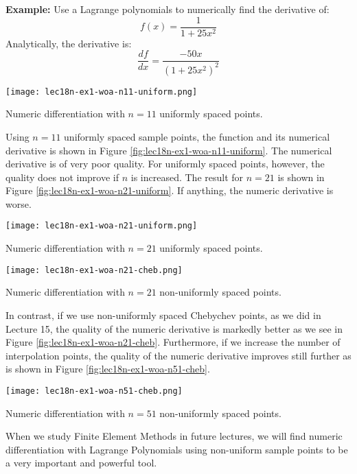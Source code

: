 \noindent\textbf{Example:} Use a Lagrange polynomials to numerically find the derivative of:
\begin{equation}
f(x) = \frac{1}{1+25x^2}
\label{eq:lec18n-f-ex1}
\end{equation}
Analytically, the derivative is:
\begin{equation*}
\frac{df}{dx} = \frac{-50x}{\left(1+25x^2\right)^2}
\end{equation*}
\begin{marginfigure}[-20.0cm]
\texttt{[image: lec18n-ex1-woa-n11-uniform.png]}
\caption{Numeric differentiation with $n=11$ uniformly spaced points.}
\label{fig:lec18n-ex1-woa-n11-uniform}
\end{marginfigure}
Using $n=11$ uniformly spaced sample points, the function and its numerical derivative is shown in Figure \ref{fig:lec18n-ex1-woa-n11-uniform}.  The numerical derivative is of very poor quality. For uniformly spaced points, however, the quality does not improve if $n$ is increased.  The result for $n=21$ is shown in Figure \ref{fig:lec18n-ex1-woa-n21-uniform}. If anything, the numeric derivative is worse.
\begin{marginfigure}[-14.0cm]
\texttt{[image: lec18n-ex1-woa-n21-uniform.png]}
\caption{Numeric differentiation with $n=21$ uniformly spaced points.}
\label{fig:lec18n-ex1-woa-n21-uniform}
\end{marginfigure}
\begin{marginfigure}[-4.0cm]
\texttt{[image: lec18n-ex1-woa-n21-cheb.png]}
\caption{Numeric differentiation with $n=21$ non-uniformly spaced points.}
\label{fig:lec18n-ex1-woa-n21-cheb}
\end{marginfigure}
In contrast, if we use non-uniformly spaced Chebychev points, as we did in Lecture 15, the quality of the numeric derivative is markedly better as we see in Figure \ref{fig:lec18n-ex1-woa-n21-cheb}.  Furthermore, if we increase the number of interpolation points, the quality of the numeric derivative improves still further as is shown in Figure \ref{fig:lec18n-ex1-woa-n51-cheb}.
\begin{marginfigure}[0.0cm]
\texttt{[image: lec18n-ex1-woa-n51-cheb.png]}
\caption{Numeric differentiation with $n=51$ non-uniformly spaced points.}
\label{fig:lec18n-ex1-woa-n51-cheb}
\end{marginfigure}
When we study Finite Element Methods in future lectures, we will find numeric differentiation with Lagrange Polynomials using non-uniform sample points to be a very important and powerful tool.

